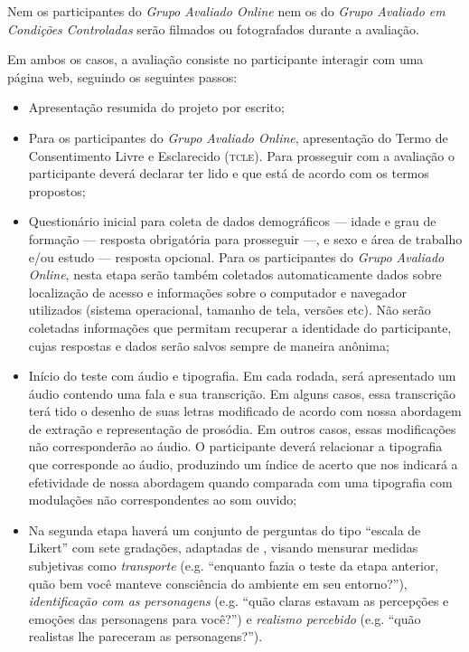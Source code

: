 \documentclass[a4paper,11pt,titlepage,singlespacing]{article}
\begin{document}


Nem os participantes do \textit{Grupo Avaliado Online} nem os do \textit{Grupo Avaliado em Condições Controladas} serão filmados ou fotografados durante a avaliação.

Em ambos os casos, a avaliação consiste no participante interagir com uma página web, seguindo os seguintes passos:

\begin{itemize}
    \item Apresentação resumida do projeto por escrito;
    \item Para os participantes do \textit{Grupo Avaliado Online}, apresentação do Termo de Consentimento Livre e Esclarecido (\textsc{tcle}). Para prosseguir com a avaliação o participante deverá declarar ter lido e que está de acordo com os termos propostos;
    \item Questionário inicial para coleta de dados demográficos — idade e grau de formação — resposta obrigatória para prosseguir —, e sexo e área de trabalho e/ou estudo — resposta opcional. Para os participantes do \textit{Grupo Avaliado Online}, nesta etapa serão também coletados automaticamente dados sobre localização de acesso e informações sobre o computador e navegador utilizados (sistema operacional, tamanho de tela, versões etc). Não serão coletadas informações que permitam recuperar a identidade do participante, cujas respostas e dados serão salvos sempre de maneira anônima; 
    \item Início do teste com áudio e tipografia. Em cada rodada, será apresentado um áudio contendo uma fala e sua transcrição. Em alguns casos, essa transcrição terá tido o desenho de suas letras modificado de acordo com nossa abordagem de extração e representação de prosódia. Em outros casos, essas modificações não corresponderão ao áudio. O participante deverá relacionar a tipografia que corresponde ao áudio, produzindo um índice de acerto que nos indicará a efetividade de nossa abordagem quando comparada com uma tipografia com modulações não correspondentes ao som ouvido;
    \item Na segunda etapa haverá um conjunto de perguntas do tipo ``escala de Likert'' com sete gradações, adaptadas de , visando mensurar medidas subjetivas como \textit{transporte} (e.g. “enquanto fazia o teste da etapa anterior, quão bem você manteve consciência do ambiente em seu entorno?”), \textit{identificação com as personagens} (e.g. “quão claras estavam as percepções e emoções das personagens para você?”) e \textit{realismo percebido} (e.g. “quão realistas lhe pareceram as personagens?”). 
\end{itemize}
\end{document}
